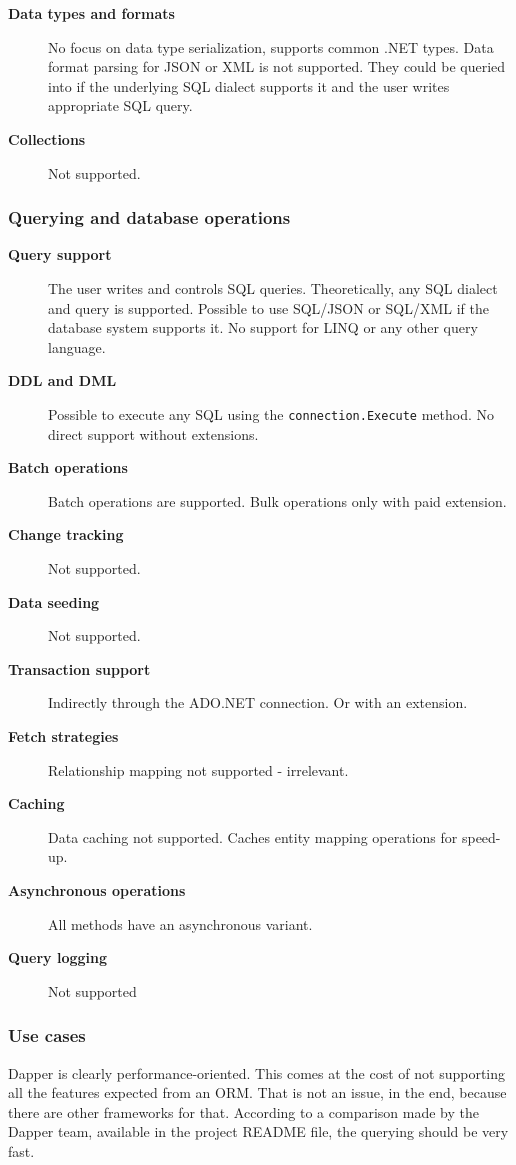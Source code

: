 \begin{description}
    \item[\textbf{Data types and formats}] No focus on data type serialization, supports common .NET types. Data format parsing for JSON or XML is not supported. They could be queried into if the underlying SQL dialect supports it and the user writes appropriate SQL query.
    
    \item[\textbf{Collections}] Not supported.
\end{description}

\subsubsection*{Querying and database operations}
\begin{description}
    \item[\textbf{Query support}] The user writes and controls SQL queries. Theoretically, any SQL dialect and query is supported. Possible to use SQL/JSON or SQL/XML if the database system supports it. No support for LINQ or any other query language. 
    \item[\textbf{DDL and DML}] Possible to execute any SQL using the \texttt{connection.Execute} method. No direct support without extensions.
    \item[\textbf{Batch operations}] Batch operations are supported. Bulk operations only with paid extension.
    \item[\textbf{Change tracking}] Not supported.
    \item[\textbf{Data seeding}] Not supported.
    \item[\textbf{Transaction support}] Indirectly through the ADO.NET connection. Or with an extension.
    \item[\textbf{Fetch strategies}] Relationship mapping not supported - irrelevant.
    \item[\textbf{Caching}] Data caching not supported. Caches entity mapping operations for speed-up.
    \item[\textbf{Asynchronous operations}] All methods have an asynchronous variant.
    \item[\textbf{Query logging}] Not supported
\end{description}

\subsubsection*{Use cases}
Dapper is clearly performance-oriented. This comes at the cost of not supporting all the features expected from an ORM. That is not an issue, in the end, because there are other frameworks for that. According to a comparison made by the Dapper team, available in the project README file\cite{DapperRepo}, the querying should be very fast.

